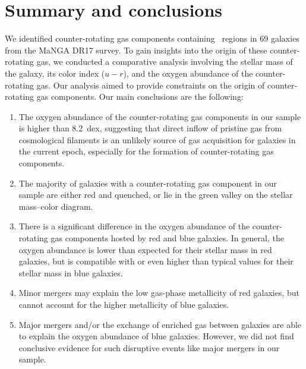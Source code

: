 \documentclass[12pt,preprint]{aa}
\begin{document}
\section{Summary and conclusions}
\label{section:Summary}

We identified counter-rotating gas components containing ~regions in 69 galaxies from the MaNGA DR17 survey. To gain insights into the origin of these counter-rotating gas, we conducted a comparative analysis involving the stellar mass of the galaxy, its color index ($u-r$), and the oxygen abundance of the counter-rotating gas. Our analysis aimed to provide constraints on the origin of counter-rotating gas components. Our main conclusions are the following:

\begin{enumerate}

\item The oxygen abundance of the counter-rotating gas components in our sample is higher than 8.2~dex, suggesting that direct inflow of pristine gas from cosmological filaments is an unlikely source of gas acquisition for galaxies in the current epoch, especially for the formation of counter-rotating gas components.

\item The majority of galaxies with a counter-rotating gas component in our sample are either red and quenched, or lie in the green valley on the stellar mass--color diagram.

\item There is a significant difference in the oxygen abundance of the counter-rotating gas components hosted by red and blue galaxies. In general, the oxygen abundance is lower than expected for their stellar mass in red galaxies, but is compatible with or even higher than typical values for their stellar mass in blue galaxies.

\item Minor mergers may explain the low gas-phase metallicity of red galaxies, but cannot account for the higher metallicity of blue galaxies.

\item Major mergers and/or the exchange of enriched gas between galaxies are able to explain the oxygen abundance of blue galaxies. However, we did not find conclusive evidence for such disruptive events like major mergers in our sample.

\end{enumerate}
\end{document}
